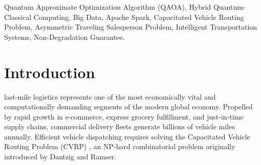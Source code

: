 \documentclass[journal,10pt]{IEEEtran}
\begin{document}
\begin{abstract}
Evaluated on the directed 54,128-node New York City road network across scales from $N=10$ to $N=100$ delivery customers (20 paired instances across 5 random seeds), ROUTE/IQ achieves an average route distance reduction of \textbf{$-1.23\%$} ($2.07\text{ km}$ mean reduction; $-1.34\%$ pooled distance reduction, Wilcoxon signed-rank $W = 105.0, p = 0.000491$, rank-biserial effect size $r_B = +1.00$) over the classical spatial baseline, and completely reverses the \textbf{$-4.55\%$} degradation observed in unconditioned hybrid QAOA relative to the spatial sweep, saving \textbf{$-4.10\%$} ($5.78\text{ km}$, $W = 194.0, p = 0.000161, r_B = +0.848$) over Phase H. Spark scaling experiments on local multithreaded execution (\texttt{local[*]}) demonstrate linear execution ($O(N \log N)$) up to $50,000$ customer orders ($6,678$ clusters) with $100\%$ customer preservation and zero capacity violations. Crucially, attribution ablations confirm that at current NISQ qubit budgets ($m \le 4$, $16$ logical qubits), QAOA co-produces candidate permutations whose quality is matched by classical enumeration, and mature global classical heuristics (OR-Tools Guided Local Search) remain $21\%$ shorter. ROUTE/IQ does not claim quantum supremacy or physical QPU execution; rather, it establishes an enterprise-grade architectural blueprint, error regularizers, and certified safety bounds for deploying quantum optimization within large-scale distributed logistics systems.
\end{abstract}

\begin{IEEEkeywords}
Quantum Approximate Optimization Algorithm (QAOA), Hybrid Quantum-Classical Computing, Big Data, Apache Spark, Capacitated Vehicle Routing Problem, Asymmetric Traveling Salesperson Problem, Intelligent Transportation Systems, Non-Degradation Guarantee.
\end{IEEEkeywords}

\section{Introduction}
 last-mile logistics represents one of the most economically vital and computationally demanding segments of the modern global economy. Propelled by rapid growth in e-commerce, express grocery fulfillment, and just-in-time supply chains, commercial delivery fleets generate billions of vehicle miles annually. Efficient vehicle dispatching requires solving the Capacitated Vehicle Routing Problem (CVRP) \cite{toth2014vehicle}, an NP-hard combinatorial problem originally introduced by Dantzig and Ramser. 
\end{document}
